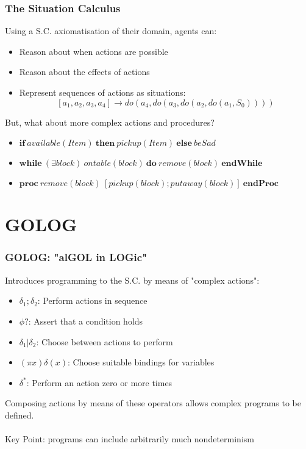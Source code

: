 \documentclass{beamer}
\begin{document}
\begin{frame}
\frametitle{The Situation Calculus}
Using a S.C. axiomatisation of their domain, agents can:
\begin{itemize}
  \item Reason about when actions are possible
  \item Reason about the effects of actions
  \item Represent sequences of actions as situations:\[
\left[a_1, a_2, a_3, a_4\right] \rightarrow do(a_4,do(a_3,do(a_2,do(a_1,S_0))))
\]
\end{itemize}
But, what about more complex actions and procedures?
\begin{itemize}
  \item $\mathbf{if}\ available(Item)\ \mathbf{then}\ pickup(Item)\ \mathbf{else}\ beSad$
  \item $\mathbf{while}\ (\exists block)\ ontable(block)\ \mathbf{do}\ remove(block)\ \mathbf{endWhile}$
  \item $\mathbf{proc}\ remove(block)\ [pickup(block);putaway(block)]\ \mathbf{endProc}$
\end{itemize}
\end{frame}

\section{GOLOG}
\begin{frame}
\frametitle{GOLOG: "alGOL in LOGic"}
Introduces programming to the S.C. by means of "complex actions":
\begin{itemize}
  \item $\delta_1;\delta_2$: Perform actions in sequence
  \item $\phi?$: Assert that a condition holds
  \item $\delta_1|\delta_2$: Choose between actions to perform
  \item $(\pi x)\delta(x)$: Choose suitable bindings for variables
  \item $\delta^*$: Perform an action zero or more times
\end{itemize}
Composing actions by means of these operators allows complex programs
to be defined.\\
\ \\
Key Point:  programs can include arbitrarily much \alert{nondeterminism}
\end{frame}
\end{document}
